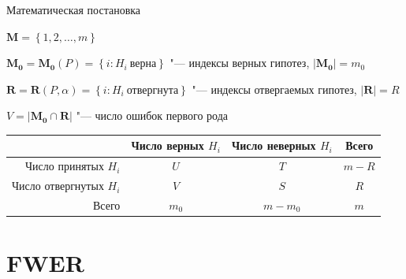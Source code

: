 \documentclass[9pt,pdf,utf8,hyperref={unicode},aspectratio=169]{beamer}
\begin{document}
\begin{frame}{Математическая постановка}
    \bigskip

    $\mathbf{M}=\left\{1,2,\ldots,m\right\}$

    $\mathbf{M_0} = \mathbf{M_0}\left(P\right) = \left\{i\colon H_i~\text{верна}\right\}$ "--- индексы верных гипотез, $\left|\mathbf{M_0}\right|=m_0$

    $\mathbf{R} = \mathbf{R}\left(P,\alpha\right) = \left\{i\colon H_i~\text{отвергнута}\right\}$ "--- индексы отвергаемых гипотез, $\left|\mathbf{R}\right|=R$

    $V=\left|\mathbf{M_0}\cap\mathbf{R}\right|$ "--- число ошибок первого рода
    \begin{center}
        \begin{tabular}{ |r | c | c | c |}
        \hline
                                & Число верных $H_i$ & Число неверных $H_i$ & Всего \\ \hline
        Число принятых $H_i$    & $U$                & $T$                  & $m-R$\\ \hline
        Число отвергнутых $H_i$ & $V$                & $S$                  & $R$\\ \hline
        Всего                   & $m_0$              & $m-m_0$              & $m$\\
        \hline
        \end{tabular}
    \end{center}
\end{frame}


\section{FWER}
\end{document}
